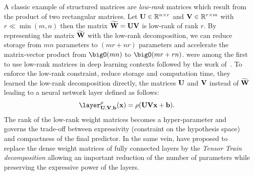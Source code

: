 \drawstar

A classic example of structured matrices are \emph{low-rank} matrices which result from the product of two rectangular matrices.
Let $\mathbf{U} \in \mathbb{R}^{n \times r}$ and $\mathbf{V} \in \mathbb{R}^{r \times m}$ with $r \ll \min(m, n)$ then the matrix $\widetilde{\mathbf{W}} = \mathbf{U} \mathbf{V}$ is low-rank of rank $r$.  
By representing the matrix $\widetilde{\mathbf{W}}$ with the low-rank decomposition, we can reduce storage from $mn$ parameters to $(mr + nr)$ parameters and accelerate the matrix-vector product from $\bigO(mn)$ to $\bigO(mr + rn)$.
\citet{sainath2013lowrank} were among the first to use low-rank matrices in deep learning contexts followed by the work of~\citet{jaderberg2014speeding,yu2017compressing}.
To enforce the low-rank constraint, reduce storage and computation time, they learned the low-rank decomposition directly, \ie the matrices $\mathbf{U}$ and $\mathbf{V}$ instead of $\widetilde{\mathbf{W}}$ leading to a neural network layer defined as follows:
\begin{equation}
  \layer^\act_{\Umat, \Vmat, \bvec} (\xvec) = \act\left( \Umat \Vmat \xvec + \bvec \right) .
\end{equation}
The rank of the low-rank weight matrices becomes a hyper-parameter and governs the trade-off between expressivity (\ie constraint on the hypothesis space) and compactness of the final predictor. 
In the same vein, \citet{novikov2015tensorizing} have proposed to replace the dense weight matrices of fully connected layers by the \emph{Tensor Train decomposition} allowing an important reduction of the number of parameters while preserving the expressive power of the layers.


%
%

